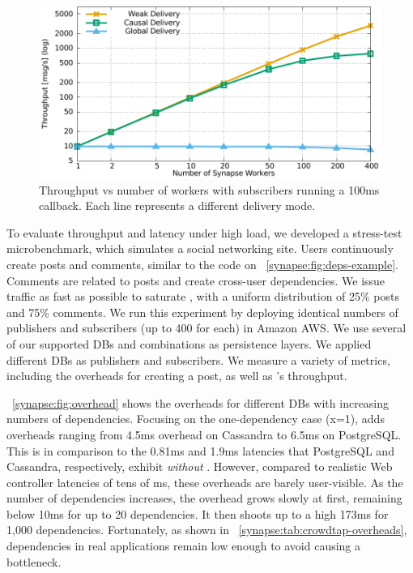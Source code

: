 \begin{figure}[]
  \centering
  \includegraphics[width=\linewidth]{figures/synapse/throughputvsworkerssaturate.pdf}
  \caption{Throughput vs number of workers with subscribers running a 100ms callback.
  Each line represents a different delivery mode.}
  \label{synapse:fig:parallel-throughput}
\end{figure}

To evaluate \synapse throughput and latency under high load, we developed a
stress-test microbenchmark, which simulates a social networking site. Users
continuously create posts and comments, similar to the code on \F~\ref{synapse:fig:deps-example}.
Comments are related to posts and create
cross-user dependencies. We issue traffic as fast as possible to saturate \synapse, with a
uniform distribution of 25\% posts and 75\% comments. We run this experiment
by deploying identical numbers of publishers and subscribers (up to 400 for
each) in Amazon AWS. We use several of our supported
DBs and combinations as persistence layers. We applied different DBs as publishers and
subscribers. We measure a variety of metrics, including the overheads for
creating a post, as well as \synapse's throughput.

\F~\ref{synapse:fig:overhead} shows the overheads for different DBs with increasing
numbers of dependencies. Focusing on the one-dependency case (x=1), \synapse
adds overheads ranging from 4.5ms overhead on Cassandra to 6.5ms on PostgreSQL.
This is in comparison to the 0.81ms and 1.9ms latencies that PostgreSQL and
Cassandra, respectively, exhibit {\em without} \synapse. However, compared to
realistic Web controller latencies of tens of ms, these overheads are barely
user-visible. As the number of dependencies increases, the overhead grows slowly
at first, remaining below 10ms for up to 20 dependencies. It then shoots up to a
high 173ms for 1,000 dependencies. Fortunately, as shown in
\F~\ref{synapse:tab:crowdtap-overheads}, dependencies in real applications remain
low enough to avoid causing a bottleneck.

